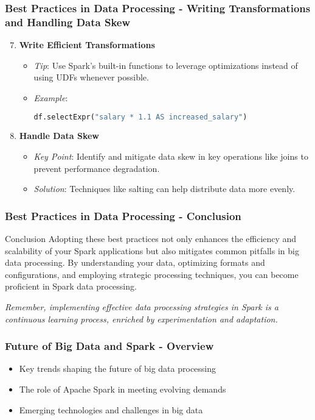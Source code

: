 \documentclass[aspectratio=169]{beamer}
\begin{document}
\begin{frame}[fragile]
    \frametitle{Best Practices in Data Processing - Writing Transformations and Handling Data Skew}
    \begin{enumerate}
        \setcounter{enumi}{6}
        \item \textbf{Write Efficient Transformations}
        \begin{itemize}
            \item \textit{Tip}: Use Spark's built-in functions to leverage optimizations instead of using UDFs whenever possible.
            \item \textit{Example}:
            \begin{lstlisting}[language=python]
            df.selectExpr("salary * 1.1 AS increased_salary")
            \end{lstlisting}
        \end{itemize}

        \item \textbf{Handle Data Skew}
        \begin{itemize}
            \item \textit{Key Point}: Identify and mitigate data skew in key operations like joins to prevent performance degradation.
            \item \textit{Solution}: Techniques like salting can help distribute data more evenly.
        \end{itemize}
    \end{enumerate}
\end{frame}

\begin{frame}[fragile]
    \frametitle{Best Practices in Data Processing - Conclusion}
    \begin{block}{Conclusion}
        Adopting these best practices not only enhances the efficiency and scalability of your Spark applications but also mitigates common pitfalls in big data processing. By understanding your data, optimizing formats and configurations, and employing strategic processing techniques, you can become proficient in Spark data processing.
    \end{block}
    \textit{Remember, implementing effective data processing strategies in Spark is a continuous learning process, enriched by experimentation and adaptation.}
\end{frame}

\begin{frame}[fragile]
  \frametitle{Future of Big Data and Spark - Overview}
  \begin{itemize}
    \item Key trends shaping the future of big data processing
    \item The role of Apache Spark in meeting evolving demands
    \item Emerging technologies and challenges in big data
  \end{itemize}
\end{frame}
\end{document}
